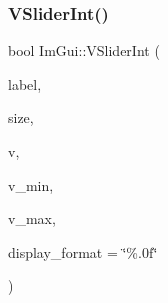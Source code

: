 \hypertarget{namespace_im_gui_a7a8e53471ef7f8b7ad28abea35a40bf4}{}\label{namespace_im_gui_a7a8e53471ef7f8b7ad28abea35a40bf4} 
\subsubsection{\texorpdfstring{V\+Slider\+Int()}{VSliderInt()}}
{\footnotesize\ttfamily bool Im\+Gui\+::\+V\+Slider\+Int (\begin{DoxyParamCaption}\item[{const char $\ast$}]{label,  }\item[{const \hyperlink{struct_im_vec2}{Im\+Vec2} \&}]{size,  }\item[{int $\ast$}]{v,  }\item[{int}]{v\+\_\+min,  }\item[{int}]{v\+\_\+max,  }\item[{const char $\ast$}]{display\+\_\+format = {\ttfamily \char`\"{}\%.0f\char`\"{}} }\end{DoxyParamCaption})}

